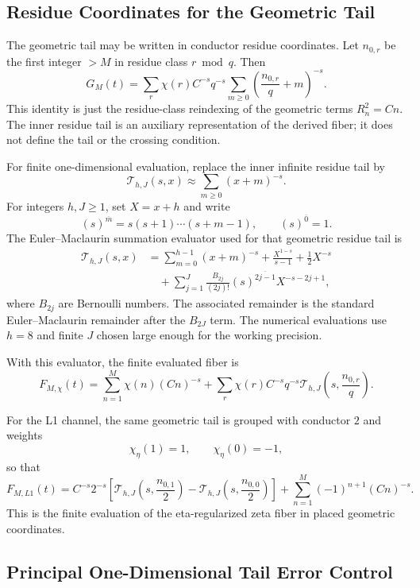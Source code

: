 \documentclass[11pt]{article}
\begin{document}
\subsection{Residue Coordinates for the Geometric Tail}

The geometric tail may be written in conductor residue coordinates.  Let
$n_{0,r}$ be the first integer $>M$ in residue class $r\bmod q$.  Then
\[
  G_M(t)
  =
  \sum_r \chi(r) C^{-s}q^{-s}
  \sum_{m\ge0}\left(\frac{n_{0,r}}q+m\right)^{-s}.
\]
This identity is just the residue-class reindexing of the geometric terms
$R_n^2=Cn$.  The inner residue tail is an auxiliary representation of the
derived fiber; it does not define the tail or the crossing condition.

For finite one-dimensional evaluation, replace the inner infinite residue tail by
\[
  \mathcal T_{h,J}(s,x)
  \approx
  \sum_{m\ge0}(x+m)^{-s}.
\]
For integers $h,J\ge1$, set $X=x+h$ and write
\[
  (s)^{\overline m}=s(s+1)\cdots(s+m-1),\qquad
  (s)^{\overline0}=1 .
\]
The Euler--Maclaurin summation evaluator used for that geometric residue tail is
\[
\begin{aligned}
  \mathcal T_{h,J}(s,x)
  &=
  \sum_{m=0}^{h-1}(x+m)^{-s}
  +\frac{X^{1-s}}{s-1}
  +\frac12 X^{-s}  \\
  &\quad+
  \sum_{j=1}^{J}
    \frac{B_{2j}}{(2j)!}
    (s)^{\overline{2j-1}}
    X^{-s-2j+1},
\end{aligned}
\]
where $B_{2j}$ are Bernoulli numbers.  The associated remainder is the standard
Euler--Maclaurin remainder after the $B_{2J}$ term.  The numerical evaluations
use $h=8$ and finite $J$ chosen large enough for the working
precision.

With this evaluator, the finite evaluated fiber is
\[
  F_{M,\chi}(t)
  =
  \sum_{n=1}^M \chi(n)(Cn)^{-s}
  +
  \sum_r \chi(r) C^{-s}q^{-s}
  \mathcal T_{h,J}\!\left(s,\frac{n_{0,r}}q\right).
\]

For the L1 channel, the same geometric tail is grouped with conductor $2$ and
weights
\[
  \chi_\eta(1)=1,\qquad \chi_\eta(0)=-1,
\]
so that
\[
  F_{M,L1}(t)
  =
  C^{-s}2^{-s}
  \left[
    \mathcal T_{h,J}\!\left(s,\frac{n_{0,1}}2\right)
    -
    \mathcal T_{h,J}\!\left(s,\frac{n_{0,0}}2\right)
  \right]
  +
  \sum_{n=1}^{M}(-1)^{n+1}(Cn)^{-s}.
\]
This is the finite evaluation of the eta-regularized zeta fiber in placed
geometric coordinates.

\subsection{Principal One-Dimensional Tail Error Control}
\end{document}
